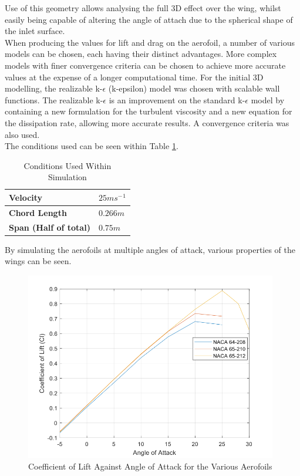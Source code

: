 \documentclass[12pt]{article}
\begin{document}
\noindent Use of this geometry allows analysing the full 3D effect over the wing, whilst easily being capable of altering the angle of attach due to the spherical shape of the inlet surface. \\

\noindent When producing the values for lift and drag on the aerofoil, a number of various models can be chosen, each having their distinct advantages. More complex models with finer convergence criteria can be chosen to achieve more accurate values at the expense of a longer computational time. For the initial 3D modelling, the realizable k-$\epsilon$ (k-epsilon) model was chosen with scalable wall functions. The realizable k-$\epsilon$ is an improvement on the standard k-$\epsilon$ model by containing a new formulation for the turbulent viscosity and a new equation for the dissipation rate, allowing more accurate results. A convergence criteria was also used. \\

\noindent The conditions used can be seen within Table \ref{tabel:spa}. \\

\begin{table}[h]
\centering
\begin{tabular}{|l|l|}
\hline
\textbf{Velocity} &  $25ms{{^-}^1}$
\\ \hline \textbf{Chord Length} & $0.266m$
\\ \hline \textbf{Span (Half of total)} & $0.75m$
\\ \hline
\end{tabular}
\caption{Conditions Used Within Simulation}
\label{tabel:spa}
\end{table}

\noindent By simulating the aerofoils at multiple angles of attack, various properties of the wings can be seen. \\

\begin{figure}[H]
\includegraphics[width=11cm, scale=1]{clvAOA.png}
\centering
\caption{Coefficient of Lift Against Angle of Attack for the Various Aerofoils}
\label{fig:clvAOA}
\end{figure}
\end{document}
